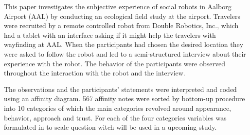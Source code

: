 \label{Abstract}
This paper investigates the subjective experience of social robots in Aalborg Airport (AAL) by conducting an ecological field study at the airport. Travelers were recruited by a remote controlled robot from Double Robotics, Inc., which had a tablet with an interface asking if it might help the travelers with wayfinding at AAL. When the participants had chosen the desired location they were asked to follow the robot and led to a semi-structured interview about their experience with the robot. The behavior of the participants were observed throughout the interaction with the robot and the interview. 

The observations and the participants' statements were interpreted and coded using an affinity diagram. 567 affinity notes were sorted by bottom-up procedure into 10 categories of which the main categories revolved around appearance, behavior, approach and trust. For each of the four categories variables was formulated in to scale question witch will be used in a upcoming study. 

